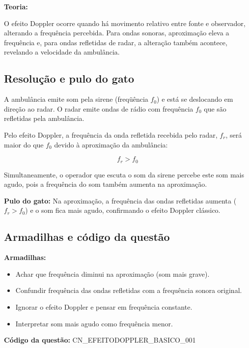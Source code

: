 \documentclass{article}
\begin{document}
\textbf{Teoria:}

O efeito Doppler ocorre quando há movimento relativo entre fonte e observador, alterando a frequência percebida. Para ondas sonoras, aproximação eleva a frequência e, para ondas refletidas de radar, a alteração também acontece, revelando a velocidade da ambulância. 

\subsection*{Resolução e pulo do gato}

A ambulância emite som pela sirene (freqüência \(f_0\)) e está se deslocando em direção ao radar. O radar emite ondas de rádio com frequência \(f_0\) que são refletidas pela ambulância. 

Pelo efeito Doppler, a frequência da onda refletida recebida pelo radar, \(f_r\), será maior do que \(f_0\) devido à aproximação da ambulância:

\[
f_r > f_0
\]

Simultaneamente, o operador que escuta o som da sirene percebe este som mais agudo, pois a frequência do som também aumenta na aproximação.

\textbf{Pulo do gato:} Na aproximação, a frequência das ondas refletidas aumenta (\(f_r > f_0\)) e o som fica mais agudo, confirmando o efeito Doppler clássico.

\subsection*{Armadilhas e código da questão}

\textbf{Armadilhas:}
\begin{itemize}
  \item Achar que frequência diminui na aproximação (som mais grave).
  \item Confundir frequência das ondas refletidas com a frequência sonora original.
  \item Ignorar o efeito Doppler e pensar em frequência constante.
  \item Interpretar som mais agudo como frequência menor.
\end{itemize}

\textbf{Código da questão:} CN\_EFEITODOPPLER\_BASICO\_001

\bigskip

\end{document}
